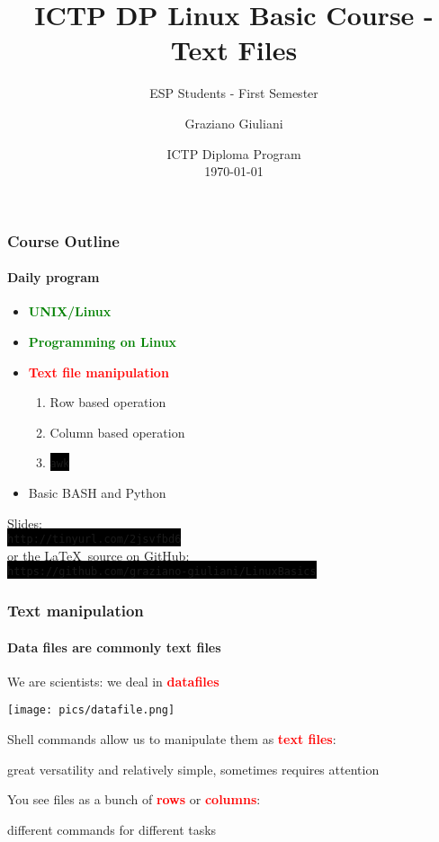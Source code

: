 \documentclass[unknownkeysallowed, 10pt, a4 paper, handout]{beamer}
\title[Linux Programming]{ICTP DP Linux Basic Course - Text Files}
\subtitle{ESP Students - First Semester}
\author[Graziano Giuliani]{Graziano Giuliani \\ \focus{ggiulian@ictp.it}}
\institute[ICTP]{The Abdus Salam International Centre for Theoretical Physics}
\date[\today]{ICTP Diploma Program \\ \today}
\newcommand{\focus}[1]{\textbf{\textcolor{red}{#1}}}
\newcommand{\expire}[1]{\textbf{\textcolor{green}{#1}}}
\newcommand{\code}[1]{\colorbox{black}{\color{green}\texttt{#1}}}
\begin{document}
\begin{frame}
  \titlepage
\end{frame}


\begin{frame}[label=outline]
  \frametitle{Course Outline \footnotemark}
  \framesubtitle{Daily program}
  \begin{itemize}
    \item \expire{UNIX/Linux}
    \item \expire{Programming on Linux}
    \item \focus{Text file manipulation}
      \begin{enumerate}
        \item Row based operation
        \item Column based operation
        \item \code{awk}
      \end{enumerate}
    \item Basic BASH and Python
  \end{itemize}

  \vspace{6mm}

  Slides: \\ \code{http://tinyurl.com/2jsvfbd6}
  \vspace{4mm} \\
  or the \LaTeX \ source on GitHub: \\
  \code{https://github.com/graziano-giuliani/LinuxBasics}


\end{frame}


\begin{frame}
  \frametitle{Text manipulation}
  \framesubtitle{Data files are commonly text files}
  We are scientists: we deal in \focus{datafiles}

  \begin{center}
    \texttt{[image: pics/datafile.png]}
  \end{center}

  \begin{block}{}
    Shell commands allow us to manipulate them as \focus{text files}:\\
    \begin{center}
    great versatility and relatively simple, sometimes requires attention
    \end{center}
    You see files as a bunch of \focus{rows} or \focus{columns}:\\
    \begin{center}
    different commands for different tasks
    \end{center}
  \end{block}
\end{frame}
\end{document}
